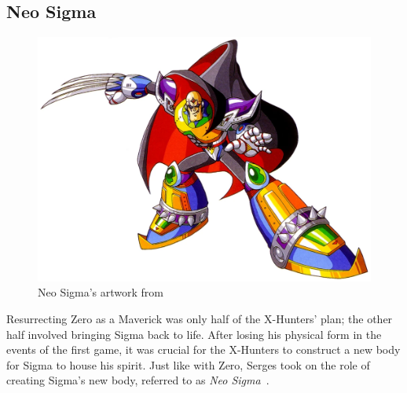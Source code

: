 \subsection{Neo Sigma}\label{boss:Sigma_x2}
\begin{figure}[htp]
	\centering
	\includegraphics[height=\portraitsize]{figures/X2/Hunter_stages/Neo_Sigma.png}
	\caption{Neo Sigma's artwork from~\cite{book:MMX_Complete_art}}
\end{figure}
Resurrecting Zero as a Maverick was only half of the X-Hunters' plan; the other half involved bringing Sigma back to life. After losing his physical form in the events of the first game, it was crucial for the X-Hunters to construct a new body for Sigma to house his spirit. Just like with Zero, Serges took on the role of creating Sigma's new body, referred to as \emph{Neo Sigma}~\cite{wayback:X2_resources}.


